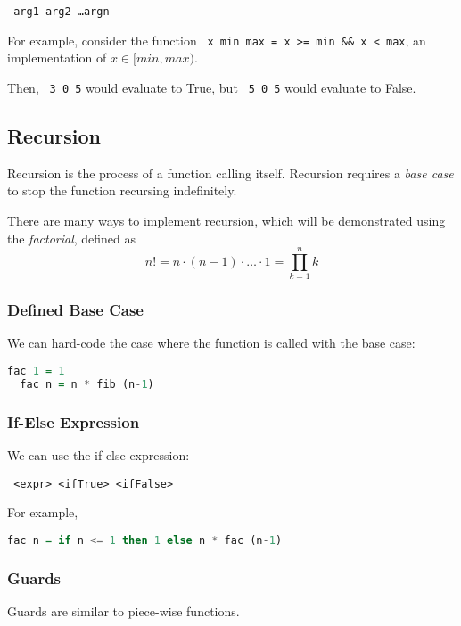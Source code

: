 \begin{center}
  \texttt{ arg1 arg2 \ldots argn}
\end{center}

For example, consider the function \texttt{ x min max = x >= min \&\& x < max}, an implementation of $x \in [min, max)$.

Then, \texttt{ 3 0 5} would evaluate to True, but \texttt{ 5 0 5} would evaluate to False.

\subsection{Recursion}
Recursion is the process of a function calling itself. Recursion requires a \textit{base case} to stop the function recursing indefinitely.

There are many ways to implement recursion, which will be demonstrated using the \textit{factorial}, defined as
\[n! = n \cdot (n - 1) \cdot \ldots \cdot 1 = \prod_{k = 1}^{n} k\]

\subsubsection{Defined Base Case}
We can hard-code the case where the function is called with the base case:

\begin{lstlisting}[language=haskell]
  fac 1 = 1
  fac n = n * fib (n-1) 
\end{lstlisting}

\subsubsection{If-Else Expression}
We can use the if-else expression:

\begin{center}
  \texttt{ <expr>  <ifTrue>  <ifFalse>}
\end{center}

For example,

\begin{lstlisting}[language=haskell]
  fac n = if n <= 1 then 1 else n * fac (n-1)
\end{lstlisting}

\subsubsection{Guards}
Guards are similar to piece-wise functions.

